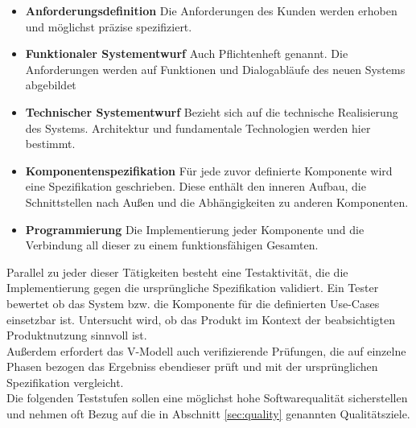 \begin{itemize}
\item \textbf{Anforderungsdefinition} Die Anforderungen des Kunden werden erhoben und möglichst präzise spezifiziert.
\item \textbf{Funktionaler Systementwurf} Auch Pflichtenheft genannt. Die Anforderungen werden auf Funktionen und Dialogabläufe des neuen Systems abgebildet\cite{spillner_basiswissen_2012}
\item \textbf{Technischer Systementwurf} Bezieht sich auf die technische Realisierung des Systems. Architektur und fundamentale Technologien werden hier bestimmt.
\item \textbf{Komponentenspezifikation} Für jede zuvor definierte Komponente wird eine Spezifikation geschrieben. Diese enthält den inneren Aufbau, die Schnittstellen nach Außen und die Abhängigkeiten zu anderen Komponenten.
\item \textbf{Programmierung} Die Implementierung jeder Komponente und die Verbindung all dieser zu einem funktionsfähigen Gesamten.
\end{itemize}

Parallel zu jeder dieser Tätigkeiten besteht eine Testaktivität, die die Implementierung gegen die ursprüngliche Spezifikation validiert. Ein Tester bewertet ob das System bzw. die Komponente für die definierten Use-Cases einsetzbar ist. Untersucht wird, ob das Produkt im Kontext der beabsichtigten Produktnutzung sinnvoll ist\cite{spillner_basiswissen_2012}.\\
Außerdem erfordert das V-Modell auch verifizierende Prüfungen, die auf einzelne Phasen bezogen das Ergebniss ebendieser prüft und mit der ursprünglichen Spezifikation vergleicht.\\
Die folgenden Teststufen sollen eine möglichst hohe Softwarequalität sicherstellen und nehmen oft Bezug auf die in Abschnitt \ref{sec:quality} genannten Qualitätsziele.

